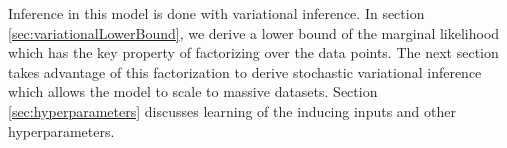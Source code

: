 %
%

Inference in this model is done with variational inference.
In section \ref{sec:variationalLowerBound}, we derive a lower bound of the marginal likelihood which has the key property of factorizing over the data points.
The next section takes advantage of this factorization to derive stochastic variational inference which allows the model to scale to massive datasets.
Section \ref{sec:hyperparameters} discusses learning of the inducing inputs and other hyperparameters.

